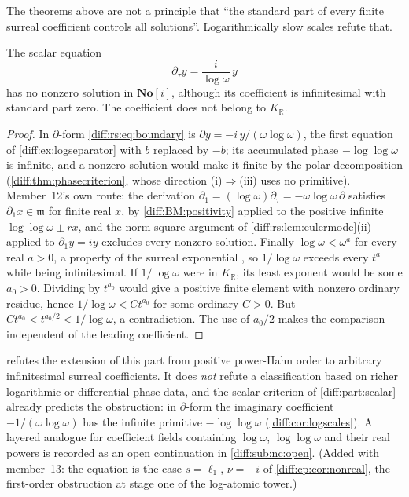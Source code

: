\documentclass[11pt,letterpaper]{article}
\numberwithin{equation}{section}
\theoremstyle{definition}
\theoremstyle{remark}
\newcommand{\SC}{\mathbf{No}[i]}
\newcommand{\R}{\mathbb R}
\newcommand{\der}{\partial}
\newcommand{\mm}{\mathfrak m}
\newcommand{\derT}{\der_{\tau}}
\newcommand{\KR}{K_{\R}}
\begin{document}
The theorems above are not a principle that ``the standard part of every finite
surreal coefficient controls all solutions''. Logarithmically slow scales refute
that.

\begin{proposition}
\label{diff:rs:prop:boundary}
The scalar equation
\begin{equation}\label{diff:rs:eq:boundary}
 \derT y=\frac{i}{\log\omega}\,y
\end{equation}
has no nonzero solution in $\SC$, although its coefficient is infinitesimal with
standard part zero. The coefficient does not belong to $\KR$.
\end{proposition}
\begin{proof}
In $\der$-form \cref{diff:rs:eq:boundary} is $\der y=-i\,y/(\omega\log\omega)$,
the first equation of \cref{diff:ex:logseparator} with $b$ replaced by $-b$; its
accumulated phase $-\log\log\omega$ is infinite, and a nonzero solution would
make it finite by the polar decomposition (\cref{diff:thm:phasecriterion}, whose
direction (i)$\Rightarrow$(iii) uses no primitive). Member~12's own route: the
derivation $\der_{1}=(\log\omega)\derT=-\omega\log\omega\,\der$ satisfies
$\der_{1}x\in\mm$ for finite real $x$, by \ref{diff:BM:positivity} applied to the
positive infinite $\log\log\omega\pm rx$, and the norm-square argument of
\cref{diff:rs:lem:eulermode}(ii) applied to $\der_{1}y=iy$ excludes every nonzero
solution. Finally $\log\omega<\omega^{a}$ for every real $a>0$, a property of the
surreal exponential \cite{BM,ADH}, so $1/\log\omega$ exceeds every $t^{a}$ while
being infinitesimal. If $1/\log\omega$ were in $\KR$, its least
exponent would be some $a_0>0$. Dividing by $t^{a_0}$ would give a
positive finite element with nonzero ordinary residue, hence
$1/\log\omega<Ct^{a_0}$ for some ordinary $C>0$. But
$Ct^{a_0}<t^{a_0/2}<1/\log\omega$, a contradiction. The use of
$a_0/2$ makes the comparison independent of the leading coefficient.
\end{proof}

\begin{remark}
\label{diff:rs:rem:boundary}
 refutes the extension of this part from positive
power-Hahn order to arbitrary infinitesimal surreal coefficients. It does
\emph{not} refute a classification based on richer logarithmic or differential
phase data, and the scalar criterion of \cref{diff:part:scalar} already predicts
the obstruction: in $\der$-form the imaginary coefficient
$-1/(\omega\log\omega)$ has the infinite primitive $-\log\log\omega$
(\cref{diff:cor:logscales}). A layered analogue for coefficient fields
containing $\log\omega$, $\log\log\omega$ and their real powers is recorded as
an open continuation in \cref{diff:sub:nc:open}. (Added with member~13: the
equation is the case $s=\ell_{1}$, $\nu=-i$ of \cref{diff:cp:cor:nonreal}, the
first-order obstruction at stage one of the log-atomic tower.)
\end{remark}
\end{document}

